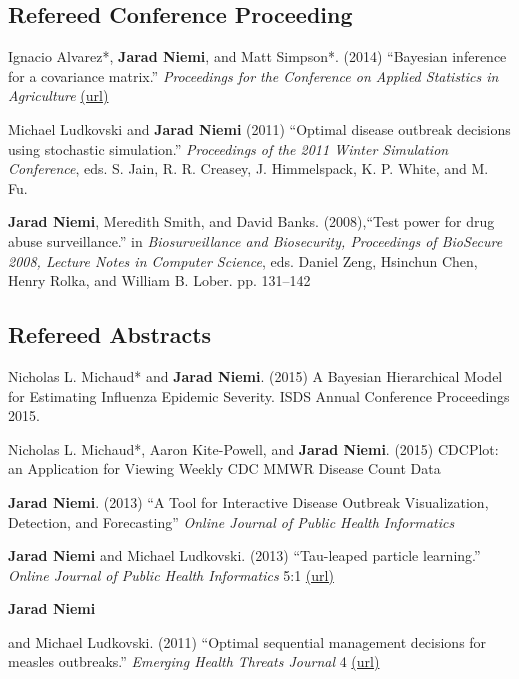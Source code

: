 \documentclass[overlapped,line]{res}
\begin{document}
\begin{resume}
\subsection{\bf Refereed Conference Proceeding}

Ignacio Alvarez*, {\bf Jarad Niemi}, and Matt Simpson*. (2014) ``Bayesian inference for a covariance matrix.'' \emph{Proceedings for the Conference on Applied Statistics in Agriculture} \href{http://newprairiepress.org/agstatconference/2014/proceedings/8/}{(url)}

Michael Ludkovski and {\bf Jarad Niemi} (2011) ``Optimal disease outbreak decisions using stochastic simulation.'' \emph{Proceedings of the 2011 Winter Simulation Conference}, eds. S. Jain, R. R. Creasey, J. Himmelspack, K. P. White, and M. Fu.

{\bf Jarad Niemi}, Meredith Smith, and David Banks. (2008),``Test power for drug abuse surveillance.'' in \emph{Biosurveillance and Biosecurity, Proceedings of BioSecure 2008, Lecture Notes in Computer Science},  eds. Daniel Zeng, Hsinchun Chen, Henry Rolka, and William B. Lober. pp. 131--142



\subsection{\bf Refereed Abstracts}

Nicholas L. Michaud* and {\bf Jarad Niemi}. (2015) A Bayesian Hierarchical Model for Estimating Influenza Epidemic Severity. ISDS Annual Conference Proceedings 2015.

Nicholas L. Michaud*, Aaron Kite-Powell, and {\bf Jarad Niemi}. (2015) CDCPlot: an Application for Viewing Weekly CDC MMWR Disease Count Data

{\bf Jarad Niemi}. (2013) ``A Tool for Interactive Disease Outbreak Visualization, Detection, and Forecasting'' \emph{Online Journal of Public Health Informatics}

{\bf Jarad Niemi} and Michael Ludkovski. (2013) ``Tau-leaped particle learning.'' \emph{Online Journal of Public Health Informatics} 5:1 \href{http://dx.doi.org/10.5210%2Fojphi.v5i1.4575}{(url)}


\newpage\opening

{\bf Jarad Niemi} and Michael Ludkovski. (2011) ``Optimal sequential management decisions for measles outbreaks.'' \emph{Emerging Health Threats Journal} 4 \href{http://dx.doi.org/10.3402/ehtj.v4i0.11907}{(url)}





\end{resume}
\end{document}
